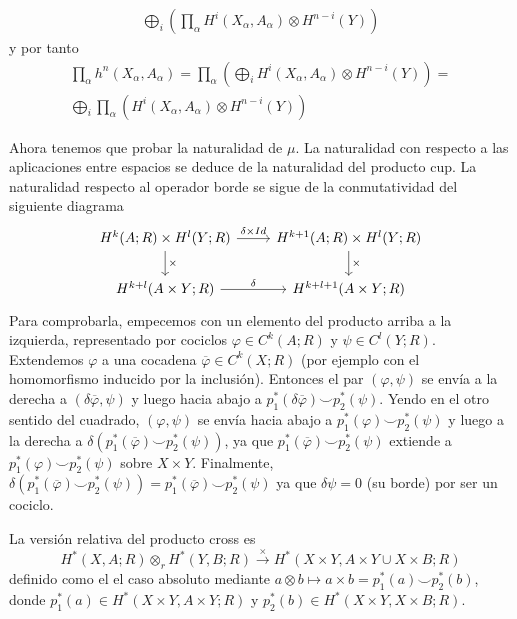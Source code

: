 \documentclass[TA.tex]{subfiles}
\begin{document}
\begin{dem}
\begin{enumerate}
\begin{gather*}
\bigoplus_i\left( \prod_\alpha H^i(X_\alpha,A_\alpha)\otimes H^{n-i}(Y)\right)
\end{gather*}
y por tanto
\begin{gather*}
\prod_\alpha h^n(X_\alpha,A_\alpha)=\prod_\alpha\left(\bigoplus_i H^i(X_\alpha,A_\alpha)\otimes H^{n-i}(Y)\right)=\\
\bigoplus_i\prod_\alpha\left(H^i(X_\alpha,A_\alpha)\otimes H^{n-i}(Y)\right)
\end{gather*}
\end{enumerate}
Ahora tenemos que probar la naturalidad de $\mu$. La naturalidad con respecto a las aplicaciones entre espacios se deduce de la naturalidad del producto cup. La naturalidad respecto al operador borde se sigue de la conmutatividad del siguiente diagrama
\[
\begin{tikzcd}
H^k(A;R)\times H^l(Y;R) \arrow[r, "\delta\times Id"] \arrow[d, "\times"] & H^{k+1}(A;R)\times H^l(Y;R) \arrow[d, "\times"] \\
H^{k+l}(A\times Y;R) \arrow[r, "\delta"] & H^{k+l+1}(A\times Y;R)
\end{tikzcd}
\]
Para comprobarla, empecemos con un elemento del producto arriba a la izquierda, representado por cociclos $\varphi\in C^k(A;R)$ y $\psi\in C^l(Y;R)$. Extendemos $\varphi$ a una cocadena $\overline{\varphi}\in C^k(X;R)$ (por ejemplo con el homomorfismo inducido por la inclusión). Entonces el par $(\varphi,\psi)$ se envía a la derecha a $(\delta\overline{\varphi}, \psi)$ y luego hacia abajo a $p_1^*(\delta\overline{\varphi})\smile p_2^*(\psi)$. Yendo en el otro sentido del cuadrado, $(\varphi,\psi)$ se envía hacia abajo a $p_1^*(\varphi)\smile p_2^*(\psi)$ y luego a la derecha a $\delta(p_1^*(\overline{\varphi})\smile p_2^*(\psi))$, ya que $p_1^*(\overline{\varphi})\smile p_2^*(\psi)$ extiende a $p_1^*(\varphi)\smile p_2^*(\psi)$ sobre $X\times Y$. Finalmente, $\delta(p_1^*(\overline{\varphi})\smile p_2^*(\psi))=p_1^*(\overline{\varphi})\smile p_2^*(\psi)$ ya que $\delta\psi=0$ (su borde) por ser un cociclo. 
\end{dem}

La versión relativa del producto cross es
\[
H^*(X,A;R)\otimes_r H^*(Y,B;R)\xrightarrow{\times} H^*(X\times Y,A\times Y\cup X\times B;R)
\]
definido como el el caso absoluto mediante $a\otimes b\mapsto a\times b=p_1^*(a)\smile p_2^*(b)$, donde $p_1^*(a)\in H^*(X\times Y,A\times Y;R)$ y $p_2^*(b)\in H^*(X\times Y,X\times B;R)$. 
\end{document}
